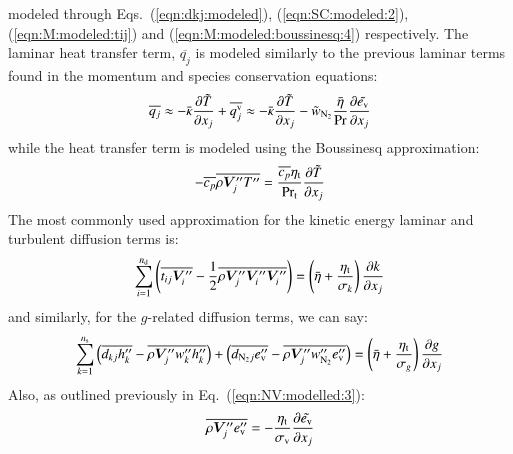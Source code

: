 \documentclass{warpdoc}
\newcommand{\Cp}{{c_{p}}}
\newcommand{\Prt}{{{\rm Pr}_{\rm t}}}
\newcommand{\nd}{{{n}_{\rm d}}}
\newcommand{\ns}{{{n}_{\rm s}}}
\newcommand{\turb}{_{\rm t}}
\newcommand{\etat}{{\eta\turb}}
\newcommand{\ev}{e_{\rm v}}
\newcommand{\cNtwo}{w_{\rm N_2}}
\newcommand{\sigmav}{\sigma_{\rm v}}
\begin{document}
modeled through Eqs.\ (\ref{eqn:dkj:modeled}), (\ref{eqn:SC:modeled:2}),
(\ref{eqn:M:modeled:tij}) and (\ref{eqn:M:modeled:boussinesq:4}) respectively.
The laminar heat transfer term, $\overline{q_j}$ is modeled similarly to
the previous laminar terms found in the momentum and species conservation equations:
%
\begin{equation}
  \overline{q_j} \approx -\wbar{\kappa} 
                         \frac{\partial \wtilde{T}}{\partial x_j}
                         +\overline{q^{\rm v}_j}
                 \approx -\wbar{\kappa} 
                         \frac{\partial \wtilde{T}}{\partial x_j}
                         - {\wtilde{w}_{\rm N_2}}\frac{\wbar{\eta}}{\Pr}\frac{\partial \wtilde{\ev}}{\partial x_j}
\label{eqn:etstar:modeled:Tdiffusionlaminar}
\end{equation}
%
while the heat transfer term is modeled using the Boussinesq approximation:
%
\begin{equation}
     -\overline{\Cp}  \overline{\rho  \bm{V}_j^{{\prime\prime}}  T^{{\prime\prime}}}
   = \frac{\overline{\Cp} \etat}{\Prt} \frac{\partial \wtilde{T}}{\partial x_j}
\label{eqn:etstar:modeled:Tdiffusion_boussinesq}
\end{equation}
%
The most commonly used approximation for the kinetic energy
laminar and turbulent diffusion terms is:
%
\begin{equation}
   \sum_{i=1}^\nd \left( \overline{ t_{ij}  \bm{V}_i^{{\prime\prime}} } -\frac{1}{2}\overline{\rho  \bm{V}_j^{{\prime\prime}}  \bm{V}_i^{{\prime\prime}}  \bm{V}_i^{{\prime\prime}} } \right)
 = \left( \wbar{\eta}+\frac{\etat}{\sigma_k} \right) \frac{\partial k}{\partial x_j}
\label{eqn:etstar:modeled:kdiffusion}
\end{equation}
%
and similarly, for the  $g$-related diffusion terms, we can say:
%
\begin{equation}
   \sum_{k=1}^\ns \left( \overline{ d_{kj}  h_k^{{\prime\prime}} } -  \overline{\rho  \bm{V}_j^{{\prime\prime}}  w_k^{{\prime\prime}}  h_k^{{\prime\prime}} } \right)
   +\left(\overline{d_{{\rm N_2}j}\ev^{{\prime\prime}} }    -\overline{\rho \bm{V}_j^{{\prime\prime}} \cNtwo^{{\prime\prime}} \ev^{{\prime\prime}}} \right)
 = \left( \wbar{\eta}+\frac{\etat}{\sigma_g} \right) \frac{\partial g}{\partial x_j}
\label{eqn:etstar:modeled:gdiffusion}
\end{equation}
%
Also, as outlined previously in Eq.\ (\ref{eqn:NV:modelled:3}):
%
\begin{equation}
  \overline{\rho \bm{V}_j^{{\prime\prime}} \ev^{{\prime\prime}}}=-\frac{\etat}{\sigmav} \frac{\partial \wtilde{\ev}}{\partial x_j}
  \label{eqn:NV:modelled:5}
\end{equation}
%
\end{document}
